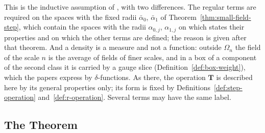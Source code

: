 \documentclass[11pt]{preprint}
\numberwithin{equation}{section}
\begin{document}
This is the inductive assumption of \cite[Sect.~2, (2.17)--(2.42)]{BalabanCRE}, with two differences. The regular terms are required on the spaces with the fixed radii $\bar\alpha_0$, $\bar\alpha_1$ of Theorem~\ref{thm:small-field-step}, which contain the spaces with the radii $\alpha_{0,j}$, $\alpha_{1,j}$ on which \cite[(2.26)--(2.28)]{BalabanCRE} states their properties and on which the other terms are defined; the reason is given after that theorem. And a density is a measure and not a function: outside $\Omega_n$ the field of the scale $n$ is the average of fields of finer scales, and in a box of a component of the second class it is carried by a gauge slice (Definition~\ref{def:box-weight}), which the papers express by $\delta$-functions. As there, the operation $\mathbf T$ is described here by its general properties only; its form is fixed by Definitions~\ref{def:step-operation} and~\ref{def:r-operation}. Several terms may have the same label.

\subsection{The Theorem}\label{sec:main-theorem}
\end{document}
